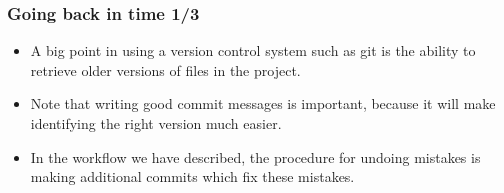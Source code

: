 %
%
% 
%
%



\begin{frame}

\frametitle{Going back in time 1/3}

	\begin{itemize}	
	\item A big point in using a version control system such as git is the ability to retrieve older versions of files in the project. 
	\item Note that writing good commit messages is important, because it will make identifying the right version much easier.
	\item In the workflow we have described, the procedure for undoing mistakes is making additional commits which fix these mistakes.
	\end{itemize}
\end{frame}


